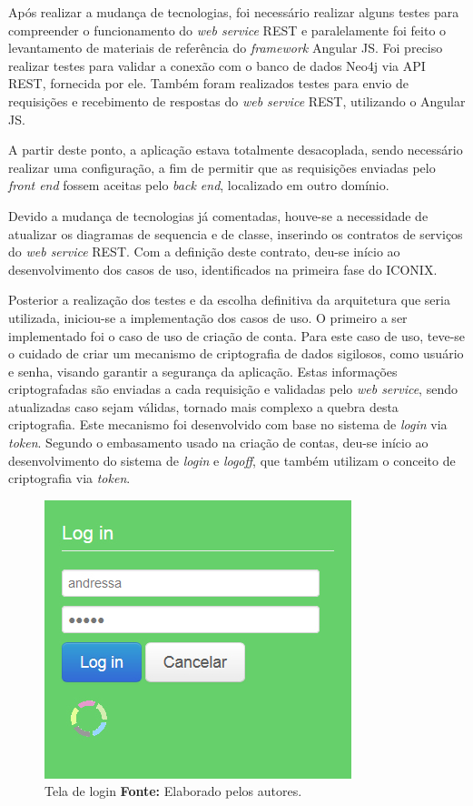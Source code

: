\par Após realizar a mudança de tecnologias, foi necessário realizar alguns testes para compreender o funcionamento do \textit{web service} REST e paralelamente foi feito o levantamento de materiais de referência do \textit{framework} Angular JS. Foi preciso realizar testes para validar a conexão com o banco de dados Neo4j via API REST, fornecida por ele. Também foram realizados testes para envio de requisições e recebimento de respostas do \textit{web service} REST, utilizando o Angular JS.

\par A partir deste ponto, a aplicação estava totalmente desacoplada, sendo necessário realizar uma configuração, a fim de permitir que as requisições enviadas pelo \textit{front end} fossem aceitas pelo \textit{back end}, localizado em outro domínio.

\par Devido a mudança de tecnologias já comentadas, houve-se a necessidade de atualizar os diagramas de sequencia e de classe, inserindo os contratos de serviços do \textit{web service} REST. Com a definição deste contrato, deu-se início ao desenvolvimento dos casos de uso, identificados na primeira fase do ICONIX. 

\par Posterior a realização dos testes e da escolha definitiva da arquitetura que seria utilizada, iniciou-se a implementação dos casos de uso. O primeiro a ser implementado foi o caso de uso de criação de conta. Para este caso de uso, teve-se o cuidado de criar um mecanismo de criptografia de dados sigilosos, como usuário e senha, visando garantir a segurança da aplicação. Estas informações criptografadas são enviadas a cada requisição e validadas pelo \textit{web service}, sendo atualizadas caso sejam válidas, tornado mais complexo a quebra desta criptografia. Este mecanismo foi desenvolvido com base no sistema de \textit{login} via \textit{token}. Segundo o embasamento usado na criação de contas, deu-se início ao desenvolvimento do sistema de \textit{login} e \textit{logoff}, que também utilizam o conceito de criptografia via \textit{token}. 

\begin{figure}[h!]
	\centerline{\includegraphics[scale=0.60]{./imagens/login.jpg}}
	\caption[Tela de login ]
	{Tela de login \textbf{Fonte:} Elaborado pelos autores.}
	\label{fig:exemplo1}
\end{figure}

